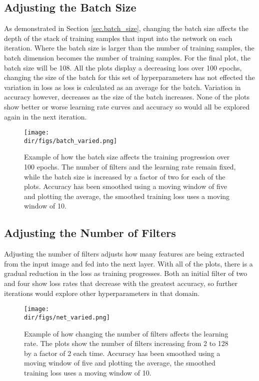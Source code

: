 \subsection{Adjusting the Batch Size}
As demonstrated in Section \ref{sec.batch_size}, changing the batch size affects the depth of the stack of training samples that input into the network on each iteration. Where the batch size is larger than the number of training samples, the batch dimension becomes the number of training samples. For the final plot, the batch size will be 108. All the plots display a decreasing loss over 100 epochs, changing the size of the batch for this set of hyperparameters has not effected the variation in loss as loss is calculated as an average for the batch. Variation in accuracy however, decreases as the size of the batch increases. None of the plots show better or worse learning rate curves and accuracy so would all be explored again in the next iteration. 
\begin{figure}[htpb]
    \centering
    \texttt{[image: \\dir/figs/batch\_varied.png]}
    \caption[Example of the affect of changing the batch size]{Example of how the batch size affects the training progression over 100 epochs. The number of filters and the learning rate remain fixed, while the batch size is increased by a factor of two for each of the plots. Accuracy has been smoothed using a moving window of five and plotting the average, the smoothed training loss uses a moving window of 10.}
    \label{fig.batch_varied}
\end{figure}
\subsection{Adjusting the Number of Filters}
Adjusting the number of filters adjusts how many features are being extracted from the input image and fed into the next layer. With all of the plots, there is a gradual reduction in the loss as training progresses. Both an initial filter of two and four show loss rates that decrease with the greatest accuracy, so further iterations would explore other hyperparameters in that domain.
\begin{figure}[htpb]
    \centering
    \texttt{[image: \\dir/figs/net\_varied.png]}
    \caption[Example of the affect of changing the number of filters in each Convolution layer]{Example of how changing the number of filters affects the learning rate. The plots show the number of filters increasing from 2 to 128 by a factor of 2 each time. Accuracy has been smoothed using a moving window of five and plotting the average, the smoothed training loss uses a moving window of 10.}
    \label{fig.net_varied}
\end{figure}
